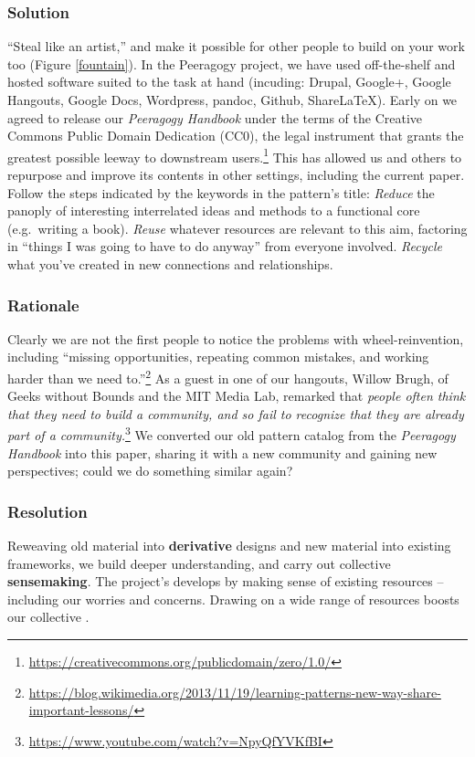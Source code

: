 \subsubsection*{Solution} ``Steal like an artist,'' and make it possible for other people to build on your work too (Figure \ref{fountain}).  In the Peeragogy project, we have used off-the-shelf and hosted software suited to the task at hand (incuding: Drupal, Google+, Google Hangouts, Google Docs, Wordpress, pandoc, Github, ShareLaTeX).  Early on we agreed to release our \emph{Peeragogy Handbook} under the terms of the Creative Commons Public Domain Dedication (CC0), the legal instrument that grants the greatest possible leeway to downstream users.\footnote{\url{https://creativecommons.org/publicdomain/zero/1.0/}}  This has allowed us and others to repurpose and improve its contents in other settings, including the current paper.  Follow the steps indicated by the keywords in the pattern's title:  \emph{Reduce} the panoply of interesting interrelated ideas and methods to a functional core (e.g.~writing a book).  \emph{Reuse} whatever resources are relevant to this aim, factoring in ``things I was going to have to do anyway'' from everyone involved.  \emph{Recycle} what you've created in new connections and relationships.

\subsubsection*{Rationale} 
Clearly we are not the first people to notice the problems with wheel-reinvention, including ``missing opportunities, repeating common mistakes, and working harder than we need to.''\footnote{\url{https://blog.wikimedia.org/2013/11/19/learning-patterns-new-way-share-important-lessons/}}  As a guest in  one of our hangouts, Willow Brugh, of Geeks without Bounds and the MIT Media Lab, remarked that \emph{people often think that they need to build a community, and so fail to recognize that they are already part of a community.}\footnote{\url{https://www.youtube.com/watch?v=NpyQfYVKfBI}}
We converted our old pattern catalog from the \emph{Peeragogy Handbook} into this paper, sharing it with a new community and gaining new perspectives; could we do something similar again?

\subsubsection*{Resolution} Reweaving old material into \textbf{derivative} designs and new material into existing frameworks, we build deeper understanding, and carry out collective \textbf{sensemaking}.
%
The project's  develops by making sense of existing resources -- including our worries and concerns.
Drawing on a wide range of resources boosts our collective .

